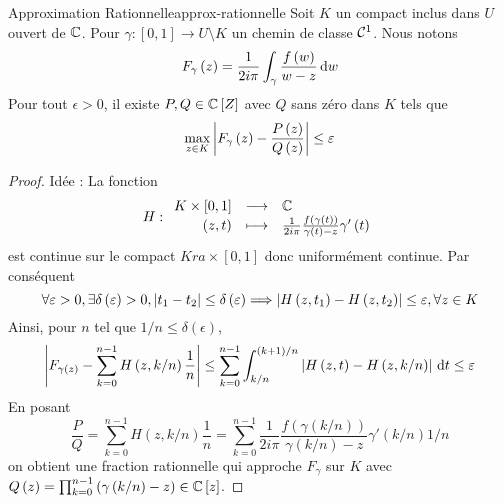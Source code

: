 \documentclass{cours}
\begin{document}
\begin{lemme}{Approximation Rationnelle}{approx-rationnelle}
    Soit $K$ un compact inclus dans $U$ ouvert de $\mathbb{C}$. Pour $\gamma : \left[0, 1\right] \to U \setminus K$ un chemin de classe $\mathcal{C}^{1}$. Nous notons 
    \begin{equation*}
        F_{\gamma}\left(z\right) = \frac{1}{2i\pi}\int_{\gamma}\frac{f\left(w\right)}{w-z}{\rm \, d} w
    \end{equation*}
    Pour tout $\epsilon > 0$, il existe $P, Q \in \mathbb{C}\left[Z\right]$ avec $Q$ sans zéro dans $K$ tels que 
    \begin{equation*}
        \max_{z \in K} \left|F_{\gamma}\left(z\right) - \frac{P\left(z\right)}{Q\left(z\right)}\right| \leq \varepsilon
    \end{equation*}
\end{lemme}
\begin{proof}
    Idée : La fonction 
    \begin{equation*}
        H : \begin{array}{rcl}
            K \times \left[0, 1\right] & \longrightarrow & \mathbb{C}\\
            \left(z, t\right) & \longmapsto & \frac{1}{2i\pi}\frac{f\left(\gamma\left(t\right)\right)}{\gamma\left(t\right) - z}\gamma'\left(t\right)
        \end{array}
    \end{equation*}
    est continue sur le compact $K ra\times \left[0, 1\right]$ donc uniformément continue. Par conséquent
    \begin{equation*}
        \forall \varepsilon > 0, \exists \delta\left(\varepsilon\right) > 0, \left|t_{1} - t_{2}\right| \leq \delta\left(\varepsilon\right) \Longrightarrow \left|H\left(z, t_{1}\right) - H\left(z, t_{2}\right)\right| \leq \varepsilon, \forall z \in K
    \end{equation*}
    Ainsi, pour $n$ tel que $1/n \leq \delta\left(\epsilon\right)$, 
    \begin{equation*}
        \left|F_{\gamma\left(z\right)} - \sum_{k = 0}^{n - 1} H\left(z, k/n\right)\frac{1}{n}\right| \leq \sum_{k = 0}^{n - 1}\int_{k/n}^{\left(k + 1\right)/n}\left|H\left(z, t\right) - H\left(z, k/n\right)\right|{\rm \, d} t \leq \varepsilon
    \end{equation*}
    En posant 
    \begin{equation*}
        \frac{P}{Q} = \sum_{k = 0}^{n - 1}H\left(z, k/n\right)\frac{1}{n} = \sum_{k = 0}^{n - 1}\frac{1}{2i\pi}\frac{f\left(\gamma\left(k/n\right)\right)}{\gamma\left(k/n\right) - z}\gamma'\left(k/n\right)1/n
    \end{equation*}
    on obtient une fraction rationnelle qui approche $F_{\gamma}$ sur $K$ avec $Q\left(z\right) = \prod_{k = 0}^{n - 1}\left(\gamma\left(k/n\right) - z\right) \in \mathbb{C}\left[z\right]$.
\end{proof}
\end{document}
